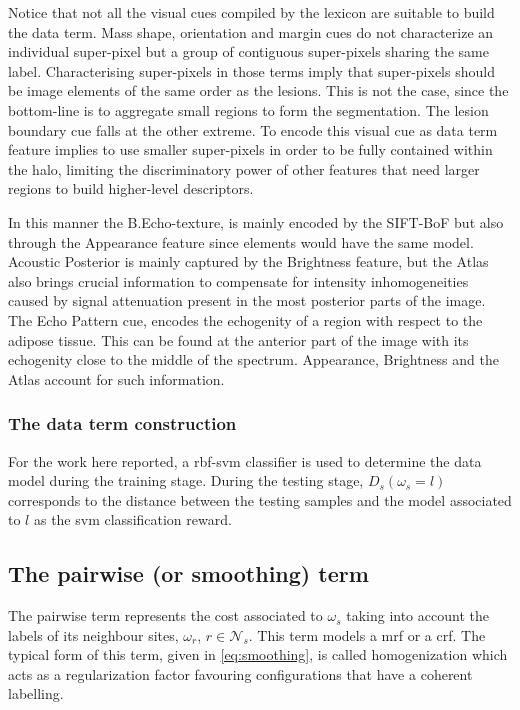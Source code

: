 Notice that not all the visual cues compiled by the lexicon are suitable to build the data term.
Mass shape, orientation and margin cues do not characterize an individual super-pixel but a group of contiguous super-pixels sharing the same label.
Characterising super-pixels in those terms imply that super-pixels should be image elements of the same order as the lesions. 
This is not the case, since the bottom-line is to aggregate small regions to form the segmentation.
The lesion boundary cue falls at the other extreme.
To encode this visual cue as data term feature implies to use smaller super-pixels in order to be fully contained within the halo, limiting the discriminatory power of other features that need larger regions to build higher-level descriptors.

In this manner the B.Echo-texture, is mainly encoded by the SIFT-BoF but also through the Appearance feature since elements would have the same model.
Acoustic Posterior is mainly captured by the Brightness feature, but the Atlas also brings crucial information to compensate for intensity inhomogeneities caused by signal attenuation present in the most posterior parts of the image.
The Echo Pattern cue, encodes the echogenity of a region with respect to the adipose tissue. This can be found at the anterior part of the image with its echogenity close to the middle of the spectrum. Appearance, Brightness and the Atlas account for such information.

\subsubsection{The data term construction}
For the work here reported, a \ac{rbf}-\ac{svm} classifier is used to determine the data model during the training stage.
During the testing stage, $D_s(\omega_s=l)$ corresponds to the distance between the testing samples and the model associated to $l$ as the \ac{svm} classification reward. 

\subsection{The pairwise (or smoothing) term} \label{sec:method:mrfTerm}
 
The pairwise term represents the cost associated to $\omega_s$ taking into account the labels of its neighbour sites, $\omega_r$, $r \in \mathcal{N}_{s}$. 
This term models a \ac{mrf} or a \ac{crf}.
The typical form of this term, given in \cref{eq:smoothing}, is called homogenization which acts as a regularization factor favouring configurations that have a coherent labelling.

